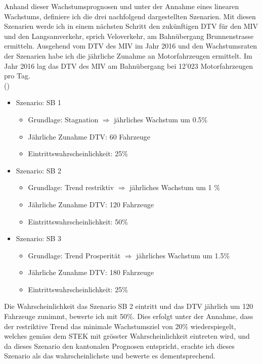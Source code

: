 Anhand dieser Wachstumsprognosen und unter der Annahme eines linearen Wachstums, definiere ich die drei nachfolgend dargestellten Szenarien. Mit diesen Szenarien werde ich in einem nächsten Schritt den zukünftigen DTV für den MIV und den Langsamverkehr, sprich Veloverkehr, am Bahnübergang Brunnenstrasse ermitteln.
Ausgehend vom DTV des MIV im Jahr 2016 und den Wachstumsraten der Szenarien habe ich die jährliche Zunahme an Motorfahrzeugen ermittelt. Im Jahr 2016 lag das DTV des MIV am Bahnübergang bei 12'023 Motorfahrzeugen pro Tag. \\ (\cite{GIS})

\begin{itemize}
\item Szenario: SB 1
	\begin{itemize}
	\item Grundlage: Stagnation $\Rightarrow$ jährliches Wachstum um 0.5\%
	\item Jährliche Zunahme DTV: 60 Fahrzeuge
	\item Eintrittswahrscheinlichkeit: 25\%
	\end{itemize}
\item Szenario: SB 2
	\begin{itemize}
	\item Grundlage: Trend restriktiv  $\Rightarrow$ jährliches Wachstum um 1 \%
	\item Jährliche Zunahme DTV: 120 Fahrzeuge
	\item Eintrittswahrscheinlichkeit: 50\%
	\end{itemize}
\item Szenario: SB 3
	\begin{itemize}
	\item Grundlage: Trend Prosperität  $\Rightarrow$ jährliches Wachstum um 1.5\%
	\item Jährliche Zunahme DTV: 180 Fahrzeuge
	\item Eintrittswahrscheinlichkeit: 25\%
	\end{itemize}
\end{itemize}


Die Wahrscheinlichkeit das Szenario SB 2 eintritt und das DTV jährlich um 120 Fahrzeuge zunimmt, bewerte ich mit 50\%. Dies erfolgt unter der Annahme, dass der restriktive Trend das minimale Wachstumsziel von 20\% wiederspiegelt, welches gemäss dem STEK mit grösster Wahrscheinlichkeit eintreten wird, und da dieses Szenario den kantonalen Prognosen entspricht, erachte ich dieses Szenario als das wahrscheinlichste und bewerte es dementsprechend.

